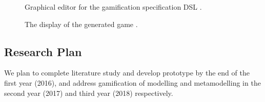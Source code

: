 \documentclass[12pt, a4paper]{report}
\begin{document}
{\begin{figure}[ht]
\centering
{}
\caption{Graphical editor for the gamification specification DSL \cite{Yohannis2016}.}
\label{editor}
\end{figure}

\begin{figure}[!t]
\centering
{}
\caption{The display of the generated game \cite{Yohannis2016}.}
\label{game-annotated}
\end{figure}




\begin{appendices}

\chapter{Research Plan}
\label{Research Plan}

We plan to complete literature study and develop prototype by the end of the first year (2016), and address gamification of modelling and metamodelling in the second year (2017) and third year (2018) respectively. 


\end{appendices}}
\end{document}
